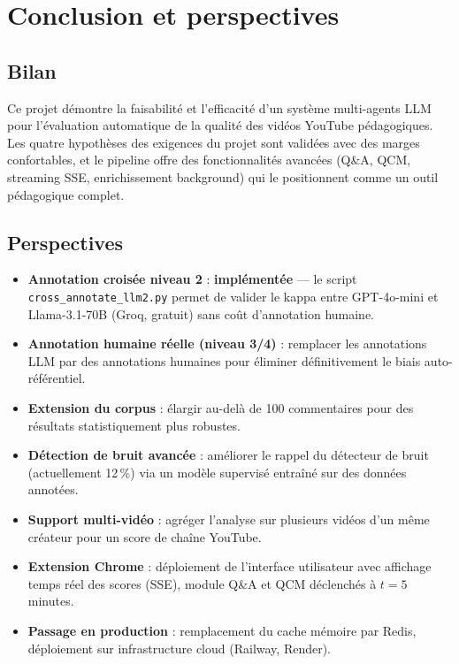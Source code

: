 \documentclass[12pt, a4paper]{article}
\begin{document}
\clearpage
\section{Conclusion et perspectives}

\subsection{Bilan}

Ce projet démontre la faisabilité et l'efficacité d'un système multi-agents LLM
pour l'évaluation automatique de la qualité des vidéos YouTube pédagogiques.
Les quatre hypothèses des exigences du projet sont validées avec des marges confortables, et
le pipeline offre des fonctionnalités avancées (Q\&A, QCM, streaming SSE,
enrichissement background) qui le positionnent comme un outil pédagogique
complet.

\subsection{Perspectives}

\begin{itemize}
  \item \textbf{Annotation croisée niveau 2} : \textcolor{green!60!black}{\textbf{implémentée}} ---
        le script \texttt{cross\_annotate\_llm2.py} permet de valider le kappa entre
        GPT-4o-mini et Llama-3.1-70B (Groq, gratuit) sans coût d'annotation humaine.
  \item \textbf{Annotation humaine réelle (niveau 3/4)} : remplacer les annotations LLM par
        des annotations humaines pour éliminer définitivement le biais auto-référentiel.
  \item \textbf{Extension du corpus} : élargir au-delà de 100 commentaires
        pour des résultats statistiquement plus robustes.
  \item \textbf{Détection de bruit avancée} : améliorer le rappel du détecteur
        de bruit (actuellement 12\,\%) via un modèle supervisé entraîné sur
        des données annotées.
  \item \textbf{Support multi-vidéo} : agréger l'analyse sur plusieurs vidéos
        d'un même créateur pour un score de chaîne YouTube.
  \item \textbf{Extension Chrome} : déploiement de l'interface utilisateur
        avec affichage temps réel des scores (SSE), module Q\&A et QCM
        déclenchés à $t = 5$ minutes.
  \item \textbf{Passage en production} : remplacement du cache mémoire par
        Redis, déploiement sur infrastructure cloud (Railway, Render).
\end{itemize}
\end{document}

